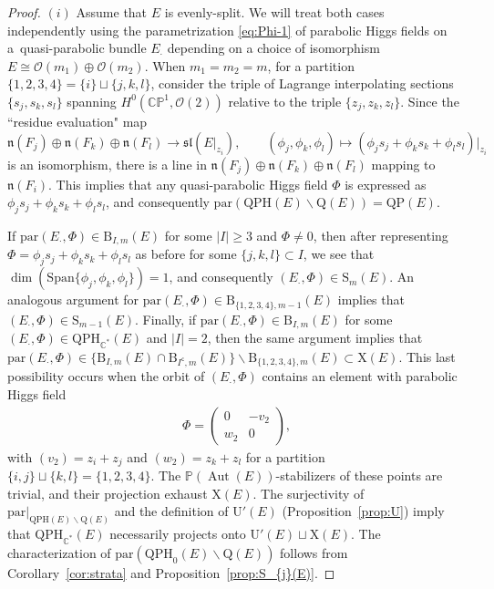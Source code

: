 \documentclass[pdftex]{sigma}
\newcommand{\field}[1]{\ensuremath{\mathbb{#1}}}
\newcommand{\CC}{\field{C}}
\newcommand{\PP}{\field{P}}
\newcommand{\calO}{\mathcal{O}}
\newcommand{\qp}{\boldsymbol{\cdot}}
\DeclareMathOperator{\Aut}{Aut}
\numberwithin{equation}{section}
\begin{document}
\begin{proof}
{\sloppy $(i)$ Assume that $E$ is evenly-split. We will treat both cases independently using the parametrization \eqref{eq:Phi-1} of parabolic Higgs fields on a~quasi-parabolic bundle $E_{\qp}$ depen\-ding on a choice of isomorphism $E\cong\calO(m_{1})\oplus\calO(m_{2})$. When $m_{1}=m_{2} = m$, for a partition $\{1,2,3,4\} = \{i\}\sqcup\{j,k,l\}$, consider the triple of Lagrange interpolating sections $\{s_{j},s_{k},s_{l}\}$ spanning $H^{0}(\CC\PP^{1},\calO(2))$ relative to the triple $\{z_{j},z_{k},z_{l}\}$. Since the ``residue evaluation" map
\[
\mathfrak{n}(F_{j})\oplus\mathfrak{n}(F_{k})\oplus\mathfrak{n}(F_{l}) \rightarrow\mathfrak{sl}(E\vert_{z_{i}}),\qquad
(\phi_{j},\phi_{k},\phi_{l})\mapsto (\phi_{j}s_{j}+\phi_{k}s_{k}+\phi_{l}s_{l})\vert_{z_{i}}
\]}\noindent
is an isomorphism, there is a line in $\mathfrak{n}(F_{j})\oplus\mathfrak{n}(F_{k})\oplus\mathfrak{n}(F_{l})$ mapping to $\mathfrak{n}(F_{i})$. This implies that any quasi-parabolic Higgs field $\Phi$ is expressed as $\phi_{j}s_{j}+\phi_{k}s_{k}+\phi_{l}s_{l}$, and consequently $\mathrm{par}(\mathrm{QPH}(E)\backslash\mathrm{Q}(E)) = \mathrm{QP}(E)$.

If $\mathrm{par}(E_{\qp},\Phi)\in\mathrm{B}_{I,m}(E)$ for some $\vert I\vert \geq 3$ and $\Phi \neq 0$, then after representing $\Phi = \phi_{j}s_{j}+\phi_{k}s_{k}+\phi_{l}s_{l}$ as before for some $\{j,k,l\}\subset I$, we see that $\dim (\mathrm{Span}\{\phi_{j},\phi_{k},\phi_{l}\}) = 1$, and consequently $(E_{\qp},\Phi)\in\mathrm{S}_{m}(E)$. An analogous argument for $\mathrm{par}(E_{\qp},\Phi)\in\mathrm{B}_{\{1,2,3,4\},m-1}(E)$ implies that $(E_{\qp},\Phi)\in\mathrm{S}_{m-1}(E)$. Finally, if $\mathrm{par}(E_{\qp},\Phi)\in\mathrm{B}_{I,m}(E)$ for some $(E_{\qp},\Phi)\in\mathrm{QPH}_{\CC^{*}}(E)$ and $\vert I\vert = 2$, then the same argument implies that $\mathrm{par}(E_{\qp},\Phi)\in\{\mathrm{B}_{I,m}(E)\cap \mathrm{B}_{I^{\mathsf{c}},m}(E)\}\backslash\mathrm{B}_{\{1,2,3,4\},m}(E)\subset \mathrm{X}(E)$. This last possibility occurs when the orbit of $(E_{\qp},\Phi)$ contains an element with parabolic Higgs field
\begin{gather}\label{eq:HX-0}
\Phi = \begin{pmatrix}
0 & -v_{2}\\
w_{2} & 0
\end{pmatrix}\!,
\end{gather}
with $(v_{2}) = z_{i}+z_{j}$ and $(w_{2}) = z_{k}+z_{l}$ for a partition $\{i,j\}\sqcup\{k,l\} = \{1,2,3,4\}$. The $\PP(\Aut(E))$-stabilizers of these points are trivial, and their projection exhaust $\mathrm{X}(E)$. The surjectivity of $\mathrm{par}\vert_{\mathrm{QPH}(E)\backslash\mathrm{Q}(E)}$ and the definition of $\mathrm{U}'(E)$ (Proposition~\ref{prop:U}) imply that $\mathrm{QPH}_{\CC^{*}}(E)$ necessa\-rily projects onto $\mathrm{U}'(E)\sqcup \mathrm{X}(E)$. The characterization of $\mathrm{par}(\mathrm{QPH}_{0}(E)\backslash\mathrm{Q}(E))$ follows from Corollary~\ref{cor:strata} and Proposition~\ref{prop:S_{j}(E)}.


\end{proof}
\end{document}
